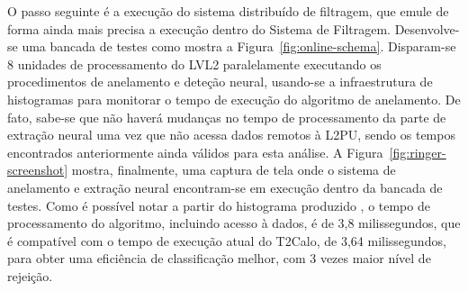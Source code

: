O passo seguinte é a execução do sistema distribuído de filtragem, que emule
de forma ainda mais precisa a execução dentro do Sistema de
Filtragem. Desenvolve-se uma bancada de testes como mostra a
Figura~\ref{fig:online-schema}. Disparam-se 8 unidades de processamento do
LVL2 paralelamente executando os procedimentos de anelamento e deteção neural,
usando-se a infraestrutura de histogramas  para monitorar o tempo
de execução do algoritmo de anelamento. De fato, sabe-se que não haverá
mudanças no tempo de processamento da parte de extração neural uma vez que não
acessa dados remotos à L2PU, sendo os tempos encontrados anteriormente ainda
válidos para esta análise. A Figura~\ref{fig:ringer-screenshot} mostra,
finalmente, uma captura de tela onde o sistema de anelamento e extração neural
encontram-se em execução dentro da bancada de testes. Como é possível notar a
partir do histograma produzido , o tempo de processamento do
algoritmo, incluindo acesso à dados, é de 3,8 milissegundos, que é compatível
com o tempo de execução atual do T2Calo, de 3,64 milissegundos, para obter uma
eficiência de classificação melhor, com 3 vezes maior nível de rejeição.





